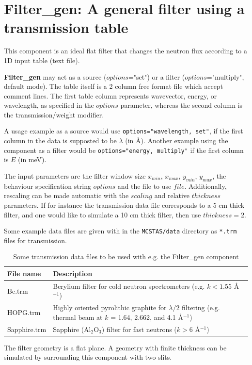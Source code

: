 \section{Filter\_gen: A general filter using a transmission table}
\label{filter-gen}


This component is an ideal flat filter
that changes the neutron flux according to a 1D input table (text file).

\textbf{Filter\_gen} may act as a source ($options$="set")
or a filter ($options$="multiply", default mode).
The table itself is a 2 column free format file which accept comment lines.
The first table column represents wavevector, energy, or wavelength,
as specified in the $options$ parameter,
whereas the second column is the transmission/weight modifier.

A usage example as a source would use
\verb+options="wavelength, set"+, if the first column in the data
is supposted to be $\lambda$ (in \AA ).
Another example using the component as a filter would be
\verb+options="energy, multiply"+ if the first column is $E$ (in meV).

The input parameters are the filter window size
$x_{min}$, $x_{max}$, $y_{min}$, $y_{max}$,
the behaviour specification string $options$ and the file to use $file$.
Additionally, rescaling can be made automatic with the $scaling$
and relative $thickness$ parameters. If for instance the transmission data file
corresponds to a 5 cm thick filter, and one would like to simulate a 10 cm thick filter,
then use $thickness = 2$.

Some example data files are given with \MCS in the
\verb+MCSTAS/data+ directory as \verb+*.trm+ files for transmission.

\begin{table}
  \begin{center}
  {\let\my=\\
    \begin{tabular}{|l|p{}|}
    \hline
    File name & Description \\
    \hline
    Be.trm       & Berylium filter for cold neutron spectrometers (e.g. $k < 1.55$  \AA$^{-1}$) \\
    HOPG.trm     & Highly oriented pyrolithic graphite for $\lambda/2$ filtering (e.g. thermal beam at $k$ = 1.64, 2.662, and 4.1 \AA$^{-1}$) \\
    Sapphire.trm & Sapphire (Al$_2$O$_3$) filter for fast neutrons ($k > 6$ \AA$^{-1}$) \\
    \hline
    \end{tabular}
    \caption{Some transmission data files to be used with e.g. the Filter\_gen component}
    \label{t:source-params}
  }
  \end{center}
\end{table}

The filter geometry is a flat plane. A geometry with finite thickness can be simulated by
surrounding this component with two slits.
